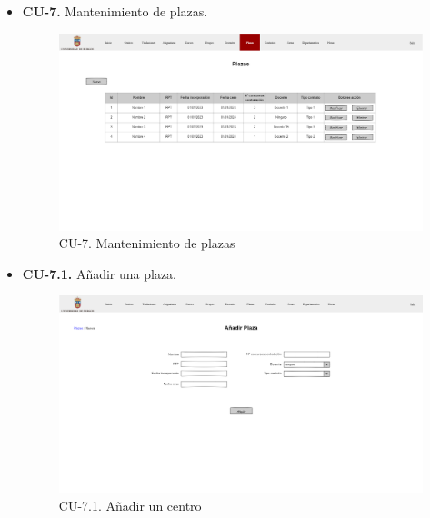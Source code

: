 \begin{itemize}
\clearpage
	
	\item \textbf{CU-7.} Mantenimiento de plazas.
	\begin{figure}[!h]
		\centering
		\includegraphics[width=\textwidth]{../img/Anexos/Vistas/plazas.png}
		\caption{CU-7. Mantenimiento de plazas}\label{fig:../img/Anexos/Vistas/plazas.png}
	\end{figure}	
	
	\item \textbf{CU-7.1.} Añadir una plaza.
	\begin{figure}[!h]
		\centering
		\includegraphics[width=\textwidth]{../img/Anexos/Vistas/add_plaza.png}
		\caption{CU-7.1. Añadir un centro}\label{fig:../img/Anexos/Vistas/add_plaza.png}
	\end{figure}
	

\end{itemize}
